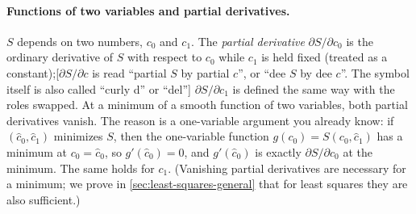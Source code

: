 \paragraph{Functions of two variables and partial derivatives.} $S$ depends on two numbers, $c_0$ and $c_1$. The \emph{partial derivative} $\partial S/\partial c_0$ is the ordinary derivative of $S$ with respect to $c_0$ while $c_1$ is held fixed (treated as a constant);[$\partial S/\partial c$ is read ``partial $S$ by partial $c$'', or ``dee $S$ by dee $c$''. The symbol itself is also called ``curly d'' or ``del''] $\partial S/\partial c_1$ is defined the same way with the roles swapped. At a minimum of a smooth function of two variables, both partial derivatives vanish. The reason is a one-variable argument you already know: if $(\hat c_0,\hat c_1)$ minimizes $S$, then the one-variable function $g(c_0)=S(c_0,\hat c_1)$ has a minimum at $c_0=\hat c_0$, so $g'(\hat c_0)=0$, and $g'(\hat c_0)$ is exactly $\partial S/\partial c_0$ at the minimum. The same holds for $c_1$. (Vanishing partial derivatives are necessary for a minimum; we prove in \cref{sec:least-squares-general} that for least squares they are also sufficient.)

